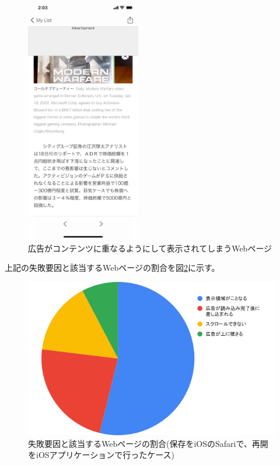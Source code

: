 \begin{figure}[htbp]
  \caption{広告がコンテンツに重なるようにして表示されてしまうWebページ}
  \label{fig:evl-consideration-scroll-position-example-ios-ad-overrap}
  \begin{center}
    \includegraphics[bb=0 0 585 1266,width=5cm]{img/060_evaluation/consideration/scroll_position/example/ios-ad-overrap.pdf}
  \end{center}
\end{figure}

上記の失敗要因と該当するWebページの割合を図\ref{fig:evl-consideration-scroll-position-cause-ratio-ios}に示す。

\begin{figure}[htbp]
  \caption{失敗要因と該当するWebページの割合(保存をiOSのSafariで、再開をiOSアプリケーションで行ったケース)}
  \label{fig:evl-consideration-scroll-position-cause-ratio-ios}
  \begin{center}
    \includegraphics[bb=0 0 600 371,width=15cm]{img/060_evaluation/consideration/scroll_position/cause-ratio-ios.pdf}
  \end{center}
\end{figure}

